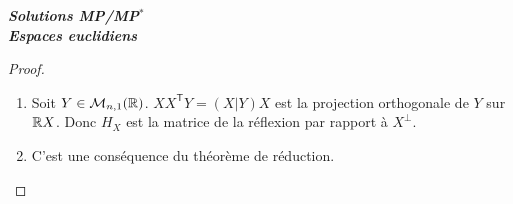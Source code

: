 \documentclass[12pt]{article}
\begin{document}
\begin{titlepage}
	\centering
	\vspace*{\fill}
	\Huge \textit{\textbf{Solutions MP/MP$^*$\\ Espaces euclidiens}}
	\vspace*{\fill}
\end{titlepage}

\begin{proof}
	\phantom{}
	\begin{enumerate}
		\item Soit $Y\in\mathcal{M}_{n,1}(\mathbb{R})$. $XX^{\mathsf{T}}Y=(X|Y)X$ est la projection orthogonale de $Y$ sur $\mathbb{R} X$. Donc $H_X$ est la matrice de la réflexion par rapport à $X^{\perp}$.
		\item C'est une conséquence du théorème de réduction.
	\end{enumerate}
\end{proof}
\end{document}
